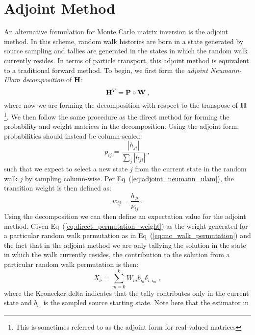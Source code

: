\section{Adjoint Method}
\label{sec:adjoint_mc}
An alternative formulation for Monte Carlo matrix inversion is the
adjoint method. In this scheme, random walk histories are born in a
state generated by source sampling and tallies are generated in the
states in which the random walk currently resides. In terms of
particle transport, this adjoint method is equivalent to a traditional
forward method. To begin, we first form the \textit{adjoint
  Neumann-Ulam decomposition} of $\mathbf{H}$:
\begin{equation}
  \mathbf{H}^{T} = \mathbf{P} \circ \mathbf{W}\:,
  \label{eq:adjoint_neumann_ulam}
\end{equation}
where now we are forming the decomposition with respect to the
transpose of $\mathbf{H}$\footnote{This is sometimes referred to as the
  adjoint form for real-valued matrices}. We then follow the same
procedure as the direct method for forming the probability and weight
matrices in the decomposition. Using the adjoint form, probabilities
should instead be column-scaled:
\begin{equation}
  p_{ij} = \frac{|h_{ji}|}{\sum_j |h_{ji}|}\:,
  \label{eq:adjoint_probability}
\end{equation}
such that we expect to select a new state $j$ from the current state
in the random walk $j$ by sampling column-wise. Per
Eq~(\ref{eq:adjoint_neumann_ulam}), the transition weight is then
defined as:
\begin{equation}
  w_{ij} = \frac{h_{ji}}{p_{ij}}\:.
  \label{eq:adjoint_weight}
\end{equation}
Using the decomposition we can then define an expectation value for
the adjoint method. Given Eq~(\ref{eq:direct_permutation_weight}) as
the weight generated for a particular random walk permutation as in
Eq~(\ref{eq:mc_walk_permutation}) and the fact that in the adjoint
method we are only tallying the solution in the state in which the
walk currently resides, the contribution to the solution from a
particular random walk permutation is then:
\begin{equation}
  X_{\nu} = \sum_{m=0}^k W_{m} b_{i_0} \delta_{i,i_m}\:,
  \label{eq:adjoint_permutation_contribution}
\end{equation}
where the Kronecker delta indicates that the tally contributes only in
the current state and $b_{i_0}$ is the sampled source starting
state. Note here that the estimator in
